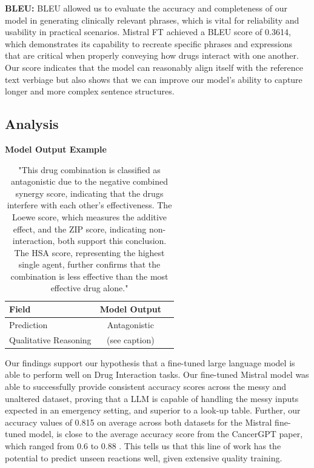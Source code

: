 \documentclass[11pt]{article}
\begin{document}
\textbf{BLEU:} BLEU allowed us to evaluate the accuracy and completeness of our model in generating clinically relevant phrases, which is vital for reliability and usability in practical scenarios. Mistral FT achieved a BLEU score of 0.3614, which demonstrates its capability to recreate specific phrases and expressions that are critical when properly conveying how drugs interact with one another. Our score indicates that the model can reasonably align itself with the reference text verbiage but also shows that we can improve our model's ability to capture longer and more complex sentence structures.


\subsection{Analysis}


\begin{table}[ht]
\centering
\textbf{Model Output Example}
\par\medskip %
\begin{tabular}{|l|c|r|} %
\hline
Field & Model Output \\ \hline
Prediction & Antagonistic \\
Qualitative Reasoning & (see caption) \\
\hline
\end{tabular}
\caption{"This drug combination is classified as antagonistic due to the negative combined synergy score, indicating that the drugs interfere with each other's effectiveness. The Loewe score, which measures the additive effect, and the ZIP score, indicating non-interaction, both support this conclusion. The HSA score, representing the highest single agent, further confirms that the combination is less effective than the most effective drug alone."}
\label{table:example}
\end{table}

Our findings support our hypothesis that a fine-tuned large language model is able to perform well on Drug Interaction tasks. Our fine-tuned Mistral model was able to successfully provide consistent accuracy scores across the messy and unaltered dataset, proving that a LLM is capable of handling the messy inputs expected in an emergency setting, and superior to a look-up table. Further, our accuracy values of 0.815 on average across both datasets for the Mistral fine-tuned model, is close to the average accuracy score from the CancerGPT paper, which ranged from 0.6 to 0.88 \cite{Li2023-lq}. This tells us that this line of work has the potential to predict unseen reactions well, given extensive quality training.
\end{document}
